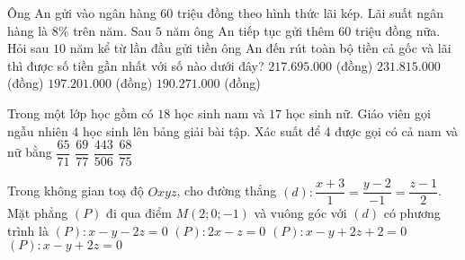 \begin{ex}%
Ông An gửi vào ngân hàng $ 60 $ triệu đồng theo hình thức lãi kép. Lãi suất ngân hàng là $ 8\% $ trên năm. Sau $ 5 $ năm ông An tiếp tục gửi thêm $ 60 $ triệu đồng nữa. Hỏi sau $ 10 $ năm kể từ lần đầu gửi tiền ông An đến rút toàn bộ tiền cả gốc và lãi thì được số tiền gần nhất với số nào dưới đây?	
	\choice
	{\True $ 217.695.000 $ (đồng)}
	{$ 231.815.000 $ (đồng)}
	{$ 197.201.000 $ (đồng)}
	{$ 190.271.000 $ (đồng)}
\end{ex}
\begin{ex}%
Trong một lớp học gồm có $ 18 $ học sinh nam và $ 17 $ học sinh nữ. Giáo viên gọi ngẫu nhiên $ 4  $ học sinh lên bảng giải bài tập. Xác suất để $ 4 $ được gọi có cả nam và nữ bằng	
	\choice
	{$ \dfrac{65}{71} $}
	{\True $ \dfrac{69}{77} $}
	{$ \dfrac{443}{506} $}
	{$ \dfrac{68}{75} $}
\end{ex}
\begin{ex}%
Trong không gian toạ độ $ Oxyz $, cho đường thẳng $ (d) \colon \dfrac{x+3}{1} = \dfrac{y-2}{-1} = \dfrac{z-1}{2} $. Mặt phẳng $ (P) $ đi qua điểm $ M(2;0;-1) $ và vuông góc với $ (d) $ có phương trình là	
	\choice
	{$ (P) \colon x - y - 2z = 0 $}
	{$ (P) \colon 2x - z = 0 $}
	{$ (P) \colon x - y + 2z + 2 = 0 $}
	{\True $ (P) \colon x - y + 2z = 0 $}
\end{ex}

